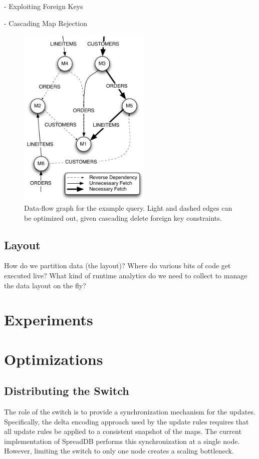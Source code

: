 \documentclass{sig-alternate}
\begin{document}
- Exploiting Foreign Keys

- Cascading Map Rejection

\begin{figure}
\begin{center}
\includegraphics[width=2.5in]{images/q12_graph.pdf}
\caption{Data-flow graph for the example query.  Light and dashed edges can be optimized out, given cascading delete foreign key constraints.}
\label{fig:dataflow}
\end{center}
\end{figure}

\subsection{Layout}
How do we partition data (the layout)?  Where do various bits of code get executed live?  What kind of runtime analytics do we need to collect to manage the data layout on the fly? 


\section{Experiments}
\label{sec:experiments}

\section{Optimizations}
\label{sec:optimizations}

\subsection{Distributing the Switch}
\label{sec:distswitch}
The role of the switch is to provide a synchronization mechanism for the updates.  Specifically, the delta encoding approach used by the update rules requires that all update rules be applied to a consistent snapshot of the maps.  The current implementation of SpreadDB performs this synchronization at a single node.  However, limiting the switch to only one node creates a scaling bottleneck.  
\end{document}
